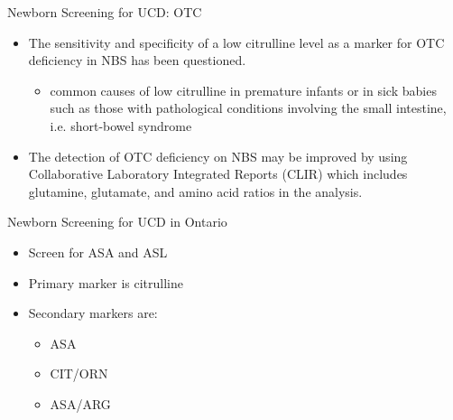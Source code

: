 \documentclass[presentation, smaller]{beamer}
\begin{document}
\begin{frame}[label={sec:orgheadline14}]{Newborn Screening for UCD: OTC}
\begin{itemize}
\item The sensitivity and specificity of a low citrulline level as a
marker for OTC deficiency in NBS has been questioned.
\begin{itemize}
\item common causes of low citrulline in premature infants or in sick
babies such as those with pathological conditions involving the
small intestine, i.e. short-bowel syndrome
\end{itemize}
\item The detection of OTC deficiency on NBS may be improved by using
Collaborative Laboratory Integrated Reports (CLIR) which includes
glutamine, glutamate, and amino acid ratios in the analysis.
\end{itemize}
\end{frame}

\begin{frame}[label={sec:orgheadline15}]{Newborn Screening for UCD in Ontario}
\begin{itemize}
\item Screen for ASA and ASL
\item Primary marker is citrulline
\item Secondary markers are:
\begin{itemize}
\item ASA
\item CIT/ORN
\item ASA/ARG
\end{itemize}
\end{itemize}
\end{frame}
\end{document}
